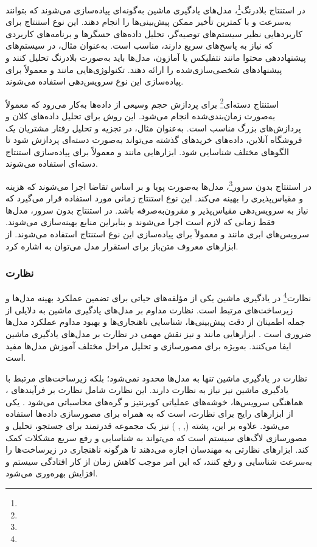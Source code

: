 در استنتاج بلادرنگ\footnote{}، مدل‌های یادگیری ماشین به‌گونه‌ای پیاده‌سازی می‌شوند که بتوانند به‌سرعت و با کمترین تأخیر ممکن پیش‌بینی‌ها را انجام دهند. این نوع استنتاج برای کاربردهایی نظیر سیستم‌های توصیه‌گر، تحلیل داده‌های حسگرها و برنامه‌های کاربردی که نیاز به پاسخ‌های سریع دارند، مناسب است. به‌عنوان مثال، در سیستم‌های پیشنهاددهی محتوا مانند نتفلیکس یا آمازون، مدل‌ها باید به‌صورت بلادرنگ تحلیل کنند و پیشنهادهای شخصی‌سازی‌شده را ارائه دهند. تکنولوژی‌هایی مانند  و  معمولاً برای پیاده‌سازی این نوع سرویس‌دهی استفاده می‌شوند.

استنتاج دسته‌ای\footnote{} برای پردازش حجم وسیعی از داده‌ها به‌کار می‌رود که معمولاً به‌صورت زمان‌بندی‌شده انجام می‌شود. این روش برای تحلیل داده‌های کلان و پردازش‌های بزرگ مناسب است. به‌عنوان مثال، در تجزیه و تحلیل رفتار مشتریان یک فروشگاه آنلاین، داده‌های خریدهای گذشته می‌تواند به‌صورت دسته‌ای پردازش شود تا الگوهای مختلف شناسایی شود. ابزارهایی مانند \cite{Spark} و \cite{Hadoop} معمولاً برای پیاده‌سازی استنتاج دسته‌ای استفاده می‌شوند.

در استنتاج بدون سرور\footnote{}، مدل‌ها به‌صورت پویا و بر اساس تقاضا اجرا می‌شوند که هزینه و مقیاس‌پذیری را بهینه می‌کند. این نوع استنتاج زمانی مورد استفاده قرار می‌گیرد که نیاز به سرویس‌دهی مقیاس‌پذیر و مقرون‌به‌صرفه باشد. در استنتاج بدون سرور، مدل‌ها فقط زمانی که لازم است اجرا می‌شوند و بنابراین منابع بهینه‌سازی می‌شوند. سرویس‌های ابری مانند  و  معمولاً برای پیاده‌سازی این نوع استنتاج استفاده می‌شوند. از ابزارهای معروف متن‌باز برای استقرار مدل می‌توان به \cite{Knative} اشاره کرد.


\subsubsection{نظارت}
نظارت\footnote{} در یادگیری ماشین یکی از مؤلفه‌های حیاتی برای تضمین عملکرد بهینه مدل‌ها و زیرساخت‌های مرتبط است. نظارت مداوم بر مدل‌های یادگیری ماشین به دلایلی از جمله اطمینان از دقت پیش‌بینی‌ها، شناسایی ناهنجاری‌ها و بهبود مداوم عملکرد مدل‌ها ضروری است \cite{MLOpsData}. ابزارهایی مانند  و  نیز نقش مهمی در نظارت بر مدل‌های یادگیری ماشین ایفا می‌کنند.  به‌ویژه برای مصورسازی و تحلیل مراحل مختلف آموزش مدل‌ها مفید است. 

نظارت در یادگیری ماشین تنها به مدل‌ها محدود نمی‌شود؛ بلکه زیرساخت‌های مرتبط با یادگیری ماشین نیز نیاز به نظارت دارند. این نظارت شامل نظارت بر فرآیندهای ، هماهنگی سرویس‌ها، خوشه‌های عملیاتی کوبرنتیز و گره‌های محاسباتی می‌شود \cite{MLOpsProd2}. یکی از ابزارهای رایج برای نظارت،  است که به همراه  برای مصورسازی داده‌ها استفاده می‌شود. علاوه بر این، پشته  (, , ) نیز یک مجموعه قدرتمند برای جستجو، تحلیل و مصورسازی لاگ‌های سیستم است که می‌تواند به شناسایی و رفع سریع مشکلات کمک کند. ابزارهای نظارتی به مهندسان اجازه می‌دهند تا هرگونه ناهنجاری در زیرساخت‌ها را به‌سرعت شناسایی و رفع کنند، که این امر موجب کاهش زمان از کار افتادگی سیستم و افزایش بهره‌وری می‌شود.

